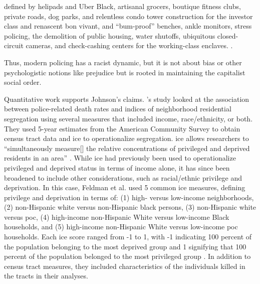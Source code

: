 \documentclass[12pt]{article}
\renewenvironment{quote}
  {\list{}{\leftmargin=\parindent\rightmargin=0pt}%
   \item\relax}
  {\endlist}
\begin{document}
\begin{quote}
defined by helipads and Uber Black, artisanal grocers, boutique fitness clubs, private roads, dog parks, and relentless condo tower construction for the investor class and renascent bon vivant, and “bum-proof” benches, ankle monitors, stress policing, the demolition of public housing, water shutoffs, ubiquitous closed-circuit cameras, and check-cashing centers for the working-class enclaves. \parencite[178]{johnsonTrumpismPolicingProblem2019}.
\end{quote}

Thus, modern policing has a racist dynamic, but it is not about bias or other psychologistic notions like prejudice but is rooted in maintaining the capitalist social order. 


Quantitative work supports Johnson’s claims. \citeauthor{feldmanPoliceRelatedDeathsNeighborhood2019}'s \parencite*{feldmanPoliceRelatedDeathsNeighborhood2019} study looked at the association between police-related death rates and indices of neighborhood residential segregation using several measures that included income, race/ethnicity, or both. They used 5-year estimates from the American Community Survey to obtain census tract data and \acrfull{ ice} to operationalize segregation. \acrshort{ice} allows researchers to “simultaneously measure[] the relative concentrations of privileged and deprived residents in an area” \parencite[459]{feldmanPoliceRelatedDeathsNeighborhood2019}. While \acrshort{ice} had previously been used to operationalize privileged and deprived status in terms of income alone, it has since been broadened to include other considerations, such as racial/ethnic privilege and deprivation. In this case, Feldman et al. used 5 common \acrshort{ice} measures, defining privilege and deprivation in terms of: (1) high- versus low-income neighborhoods, (2) non-Hispanic white versus non-Hispanic black persons, (3) non-Hispanic white versus \acrfull{poc}, (4) high-income non-Hispanic White versus low-income Black households, and (5) high-income non-Hispanic White versus low-income \acrshort{poc} households. Each \acrshort{ice} score ranged from -1 to 1, with -1 indicating 100 percent of the population belonging to the most deprived group and 1 signifying that 100 percent of the population belonged to the most privileged group \parencite[459]{feldmanPoliceRelatedDeathsNeighborhood2019}. In addition to census tract measures, they included characteristics of the individuals killed in the tracts in their analyses.
\end{document}
